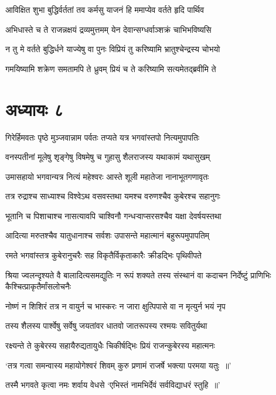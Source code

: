 \twolineshloka
{आविक्षित शुभा बुद्धिर्वर्ततां तव कर्मसु}
{याजनं हि ममाप्येव वर्तते हृदि पार्थिव}


\twolineshloka
{अभिधास्ते च ते राजन्नक्षयं द्रव्यमुत्तमम्}
{येन देवान्सग्धर्वाञ्शक्रं चाभिभविष्यसि}


\twolineshloka
{न तु मे वर्तते बुद्धिर्धने याज्येषु वा पुनः}
{विप्रियं तु करिष्यामि भ्रातुश्चेन्द्रस्य चोभयो}


\twolineshloka
{गमयिष्यामि शक्रेण समतामपि ते ध्रुवम्}
{प्रियं च ते करिष्यामि सत्यमेतद्ब्रवीमि ते}


\chapter{अध्यायः ८}
\twolineshloka
{गिरेर्हिमवतः पृष्ठे मुञ्जवान्नाम पर्वतः}
{तप्यते यत्र भगवांस्तपो नित्यमुपापतिः}


\twolineshloka
{वनस्पतीनां मूलेषु शृङ्गेषु विषमेषु च}
{गुहासु शैलराजस्य यथाकामं यथासुखम्}


\twolineshloka
{उमासहायो भगवान्यत्र नित्यं महेश्वरः}
{आस्ते शूली महातेजा नानाभूतगणावृतः}


\twolineshloka
{तत्र रुद्राश्च साध्याश्च विश्वेऽथ वसवस्तथा}
{यमश्च वरुणश्चैव कुबेरश्च सहानुगः}


\twolineshloka
{भूतानि च पिशाचाश्च नासत्यावपि चाश्विनौ}
{गन्धऱ्वाप्सरसश्चैव यक्षा देवर्षयस्तथा}


\twolineshloka
{आदित्या मरुतश्चैव यातुधानाश्च सर्वशः}
{उपासन्ते महात्मानं बहुरूपमुपापतिम्}


\twolineshloka
{रमते भगवांस्तत्र कुबेरानुचरैः सह}
{विकृतैर्विकृताकारैः क्रीडद्भिः पृथिवीपते}


\threelineshloka
{श्रिया ज्वलन्दृश्यते वै बालादित्यसमद्युतिः}
{न रूपं शक्यते तस्य संस्थानं वा कदाचन}
{निर्देष्टुं प्राणिभिः कैश्चित्प्राकृतैर्मांसलोचनैः}


\twolineshloka
{नोष्णं न शिशिरं तत्र न वायुर्न च भास्करः}
{न जारा क्षुत्पिपासे वा न मृत्युर्न भयं नृप}


\twolineshloka
{तस्य शैलस्य पार्श्वेषु सर्वेषु जयतांवर}
{धातवो जातरूपस्य रश्मयः सवितुर्यथा}


\twolineshloka
{रक्ष्यन्ते ते कुबेरस्य सहायैरुद्यतायुधैः}
{चिकीर्षद्भिः प्रियं राजन्कुबेरस्य महात्मनः}


\twolineshloka
{`तत्र गत्वा समन्वास्य महायोगेश्वरं शिवम्}
{कुरु प्रणामं राजर्षे भक्त्या परमया यतुः ॥'}


\twolineshloka
{तस्मै भगवते कृत्वा नमः शर्वाय वेधसे}
{`एभिस्तं नामभिर्देवं सर्वविद्याधरं स्तुहि ॥'}



